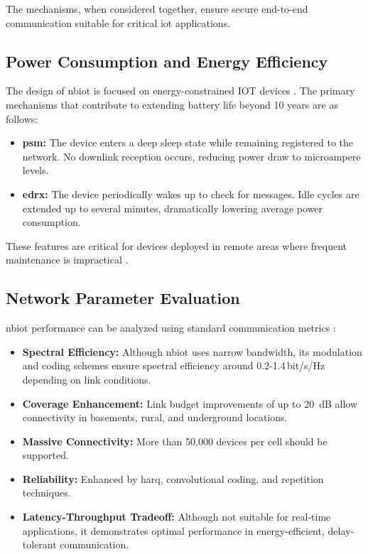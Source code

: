 \documentclass[12pt, english, openany]{book}
\begin{document}
The mechanisms, when considered together, ensure secure end-to-end communication suitable for critical \gls{iot} applications.

\subsection{Power Consumption and Energy Efficiency}

The design of \gls{nbiot} is focused on energy-constrained IOT devices \parencite{NBIOT_POWER}. The primary mechanisms that contribute to extending battery life beyond 10 years are as follows:

\begin{itemize}
    \item \textbf{\gls{psm}:} The device enters a deep sleep state while remaining registered to the network. No downlink reception occurs, reducing power draw to microampere levels.
    \item \textbf{\gls{edrx}:} The device periodically wakes up to check for messages. Idle cycles are extended up to several minutes, dramatically lowering average power consumption.
\end{itemize}

These features are critical for devices deployed in remote areas where frequent maintenance is impractical \parencite{NBIOT_POWER}.

\subsection{Network Parameter Evaluation}

\gls{nbiot} performance can be analyzed using standard communication metrics \parencite{NBIOT_SYSTEM}:

\begin{itemize}
    \item \textbf{Spectral Efficiency:} Although \gls{nbiot} uses narrow bandwidth, its modulation and coding schemes ensure spectral efficiency around 0.2-1.4\,bit/s/Hz depending on link conditions.
    \item \textbf{Coverage Enhancement:} Link budget improvements of up to \SI{20}{dB} allow connectivity in basements, rural, and underground locations.
    \item \textbf{Massive Connectivity:} More than 50,000 devices per cell should be supported.
    \item \textbf{Reliability:} Enhanced by \gls{harq}, convolutional coding, and repetition techniques.
    \item \textbf{Latency-Throughput Tradeoff:} Although not suitable for real-time applications, it demonstrates optimal performance in energy-efficient, delay-tolerant communication.
\end{itemize}
\end{document}
